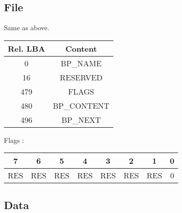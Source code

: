 \documentclass{article}
\begin{document}
\subsection{File}
Same as above.
\newline
\begin{tabular}{|c|c|}
  \hline
  Rel. LBA & Content \\
  \hline
  0 & BP\_NAME \\
  \hline
  16 &  RESERVED \\
  \hline
  479 &  FLAGS \\
  \hline
  480 & BP\_CONTENT \\
  \hline
  496 & BP\_NEXT \\
  \hline
  
\end{tabular}
\newline
Flags :
\begin{tabular}{|c|c|c|c|c|c|c|c|}
  \hline
  7 & 6 & 5 & 4 & 3 & 2 & 1 & 0 \\
  \hline
  RES & RES & RES & RES & RES & RES & RES & 0  \\
  \hline
\end{tabular}
\subsection{Data}
\end{document}
